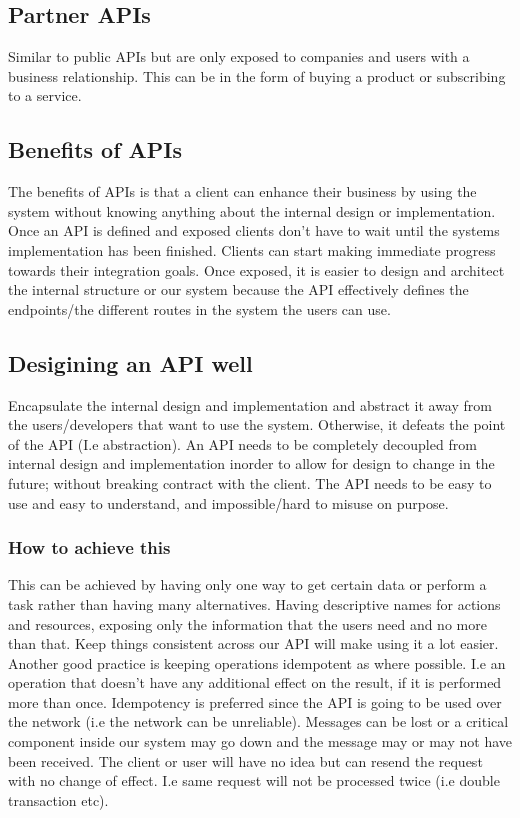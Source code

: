 \subsection{Partner APIs}
Similar to public APIs but are only exposed to companies and users with a business relationship.
This can be in the form of buying a product or subscribing to a service.

\subsection{Benefits of APIs}
The benefits of APIs is that a client can enhance their business by using the system without knowing anything about the internal design or implementation.
Once an API is defined and exposed clients don't have to wait until the systems implementation has been finished.
Clients can start making immediate progress towards their integration goals.
Once exposed, it is easier to design and architect the internal structure or our system because the API effectively defines the endpoints/the different routes in the system the users can use.

\subsection{Desigining an API well}
Encapsulate the internal design and implementation and abstract it away from the users/developers that want to use the system.
Otherwise, it defeats the point of the API (I.e abstraction).
An API needs to be completely decoupled from internal design and implementation inorder to allow for design to change in the future; without breaking contract with the client.
The API needs to be easy to use and easy to understand, and impossible/hard to misuse on purpose.

\subsubsection{How to achieve this}
This can be achieved by having only one way to get certain data or perform a task rather than having many alternatives.
Having descriptive names for actions and resources, exposing only the information that the users need and no more than that.
Keep things consistent across our API will make using it a lot easier.
Another good practice is keeping operations idempotent as where possible.
I.e an operation that doesn't have any additional effect on the result, if it is performed more than once.
Idempotency is preferred since the API is going to be used over the network (i.e the network can be unreliable).
Messages can be lost or a critical component inside our system may go down and the message may or may not have been received.
The client or user will have no idea but can resend the request with no change of effect.
I.e same request will not be processed twice (i.e double transaction etc).

